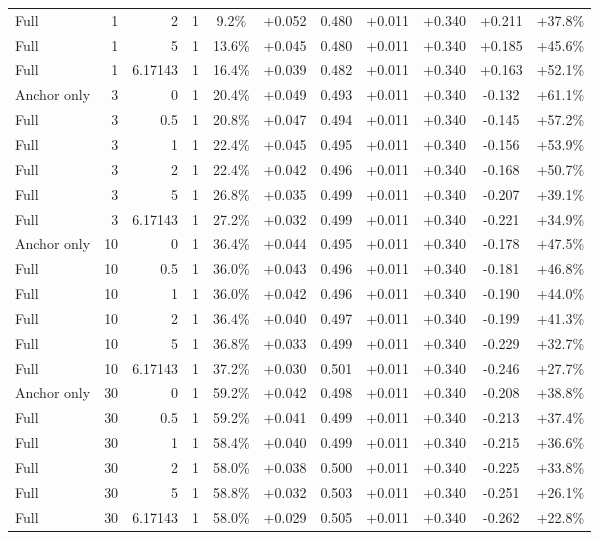 \begin{table}[htbp]
\begin{tabular}{lrrrccccccc}
Full & 1 & 2 & 1 & 9.2\% & +0.052 & 0.480 & +0.011 & +0.340 & +0.211 & +37.8\% \\
Full & 1 & 5 & 1 & 13.6\% & +0.045 & 0.480 & +0.011 & +0.340 & +0.185 & +45.6\% \\
Full & 1 & 6.17143 & 1 & 16.4\% & +0.039 & 0.482 & +0.011 & +0.340 & +0.163 & +52.1\% \\
Anchor only & 3 & 0 & 1 & 20.4\% & +0.049 & 0.493 & +0.011 & +0.340 & -0.132 & +61.1\% \\
Full & 3 & 0.5 & 1 & 20.8\% & +0.047 & 0.494 & +0.011 & +0.340 & -0.145 & +57.2\% \\
Full & 3 & 1 & 1 & 22.4\% & +0.045 & 0.495 & +0.011 & +0.340 & -0.156 & +53.9\% \\
Full & 3 & 2 & 1 & 22.4\% & +0.042 & 0.496 & +0.011 & +0.340 & -0.168 & +50.7\% \\
Full & 3 & 5 & 1 & 26.8\% & +0.035 & 0.499 & +0.011 & +0.340 & -0.207 & +39.1\% \\
Full & 3 & 6.17143 & 1 & 27.2\% & +0.032 & 0.499 & +0.011 & +0.340 & -0.221 & +34.9\% \\
Anchor only & 10 & 0 & 1 & 36.4\% & +0.044 & 0.495 & +0.011 & +0.340 & -0.178 & +47.5\% \\
Full & 10 & 0.5 & 1 & 36.0\% & +0.043 & 0.496 & +0.011 & +0.340 & -0.181 & +46.8\% \\
Full & 10 & 1 & 1 & 36.0\% & +0.042 & 0.496 & +0.011 & +0.340 & -0.190 & +44.0\% \\
Full & 10 & 2 & 1 & 36.4\% & +0.040 & 0.497 & +0.011 & +0.340 & -0.199 & +41.3\% \\
Full & 10 & 5 & 1 & 36.8\% & +0.033 & 0.499 & +0.011 & +0.340 & -0.229 & +32.7\% \\
Full & 10 & 6.17143 & 1 & 37.2\% & +0.030 & 0.501 & +0.011 & +0.340 & -0.246 & +27.7\% \\
Anchor only & 30 & 0 & 1 & 59.2\% & +0.042 & 0.498 & +0.011 & +0.340 & -0.208 & +38.8\% \\
Full & 30 & 0.5 & 1 & 59.2\% & +0.041 & 0.499 & +0.011 & +0.340 & -0.213 & +37.4\% \\
Full & 30 & 1 & 1 & 58.4\% & +0.040 & 0.499 & +0.011 & +0.340 & -0.215 & +36.6\% \\
Full & 30 & 2 & 1 & 58.0\% & +0.038 & 0.500 & +0.011 & +0.340 & -0.225 & +33.8\% \\
Full & 30 & 5 & 1 & 58.8\% & +0.032 & 0.503 & +0.011 & +0.340 & -0.251 & +26.1\% \\
Full & 30 & 6.17143 & 1 & 58.0\% & +0.029 & 0.505 & +0.011 & +0.340 & -0.262 & +22.8\% \\

\end{tabular}
\end{table}
